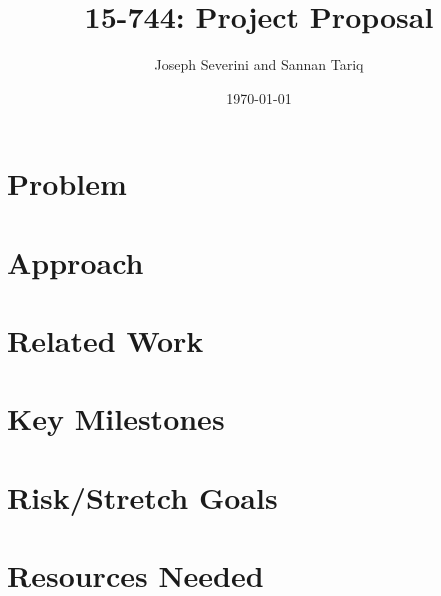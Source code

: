 \documentclass[dvips,12pt]{article}
\begin{document}

\title{15-744: Project Proposal}
\author{Joseph Severini and Sannan Tariq}
\date{\today}



\maketitle


\section{Problem}






%


\section{Approach}


\section{Related Work}


\section{Key Milestones}


\section{Risk/Stretch Goals}


\section{Resources Needed}




\end{document}
